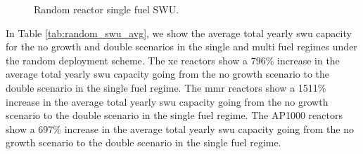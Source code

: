 
\begin{figure}[H]
    \hfill
    \caption{Random reactor single fuel SWU.}
    \label{fig:random_of_swu}
\end{figure}


In Table \ref{tab:random_swu_avg}, we show the average total yearly \gls{swu} capacity for the no growth and double scenarios in the single and multi fuel regimes under the random deployment scheme. The \gls{xe} reactors show a 796\% increase in the average total yearly \gls{swu} capacity going from the no growth scenario to the double scenario in the single fuel regime. The \gls{mmr} reactors show a 1511\% increase in the average total yearly \gls{swu} capacity going from the no growth scenario to the double scenario in the single fuel regime. The AP1000 reactors show a 697\% increase in the average total yearly \gls{swu} capacity going from the no growth scenario to the double scenario in the single fuel regime.

